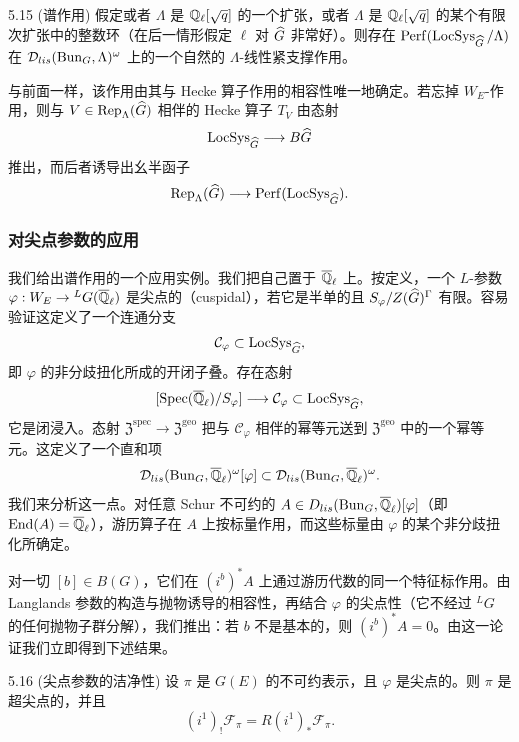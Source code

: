 \begin{thm}{5.15 (谱作用)}\label{thm:a3-5-15}
假定或者 $\Lambda$ 是 $\mathbb{Q}_\ell[\sqrt q]$ 的一个扩张，或者 $\Lambda$ 是 $\mathbb{Q}_\ell[\sqrt q]$ 的某个有限次扩张中的整数环（在后一情形假定 $\ell$ 对 $\widehat{G}$ 非常好）。则存在 $\operatorname{Perf}(\operatorname{LocSys}_{\widehat{G}}/\Lambda)$ 在 $\mathcal{D}_{lis}(\operatorname{Bun}_G,\Lambda)^\omega$ 上的一个自然的 $\Lambda$-线性紧支撑作用。
\end{thm}

与前面一样，该作用由其与 Hecke 算子作用的相容性唯一地确定。若忘掉 $W_E$-作用，则与 $V\in\operatorname{Rep}_\Lambda(\widehat{G})$ 相伴的 Hecke 算子 $T_V$ 由态射
\[
\operatorname{LocSys}_{\widehat{G}}\longrightarrow B\widehat{G}
\]
推出，而后者诱导出幺半函子
\[
\operatorname{Rep}_\Lambda(\widehat{G})\longrightarrow \operatorname{Perf}(\operatorname{LocSys}_{\widehat{G}}).
\]

\subsubsection{对尖点参数的应用}
我们给出谱作用的一个应用实例。我们把自己置于 $\overline{\mathbb{Q}}_\ell$ 上。按定义，一个 $L$-参数 $\varphi:W_E\to{}^LG(\overline{\mathbb{Q}}_\ell)$ 是尖点的（cuspidal），若它是半单的且 $S_\varphi/Z(\widehat{G})^\Gamma$ 有限。容易验证这定义了一个连通分支
\[
\mathcal{C}_\varphi\subset\operatorname{LocSys}_{\widehat{G}},
\]
即 $\varphi$ 的非分歧扭化所成的开闭子叠。存在态射
\[
[\operatorname{Spec}(\overline{\mathbb{Q}}_\ell)/S_\varphi]\longrightarrow\mathcal{C}_\varphi\subset\operatorname{LocSys}_{\widehat{G}},
\]
它是闭浸入。态射 $\mathfrak Z^{\mathrm{spec}}\to\mathfrak Z^{\mathrm{geo}}$ 把与 $\mathcal{C}_\varphi$ 相伴的幂等元送到 $\mathfrak Z^{\mathrm{geo}}$ 中的一个幂等元。这定义了一个直和项
\[
\mathcal{D}_{lis}(\operatorname{Bun}_G,\overline{\mathbb{Q}}_\ell)^\omega[\varphi]\subset\mathcal{D}_{lis}(\operatorname{Bun}_G,\overline{\mathbb{Q}}_\ell)^\omega.
\]
我们来分析这一点。对任意 Schur 不可约的 $A\in D_{lis}(\operatorname{Bun}_G,\overline{\mathbb{Q}}_\ell)[\varphi]$（即 $\operatorname{End}(A)=\overline{\mathbb{Q}}_\ell$），游历算子在 $A$ 上按标量作用，而这些标量由 $\varphi$ 的某个非分歧扭化所确定。

对一切 $[b]\in B(G)$，它们在 $(i^b)^*A$ 上通过游历代数的同一个特征标作用。由 Langlands 参数的构造与抛物诱导的相容性，再结合 $\varphi$ 的尖点性（它不经过 $^LG$ 的任何抛物子群分解），我们推出：若 $b$ 不是基本的，则 $(i^b)^*A=0$。由这一论证我们立即得到下述结果。

\begin{thm}{5.16 (尖点参数的洁净性)}\label{thm:a3-5-16}
设 $\pi$ 是 $G(E)$ 的不可约表示，且 $\varphi$ 是尖点的。则 $\pi$ 是超尖点的，并且
\[
(i^1)_!\mathcal{F}_\pi=R(i^1)_*\mathcal{F}_\pi.
\]
\end{thm}

